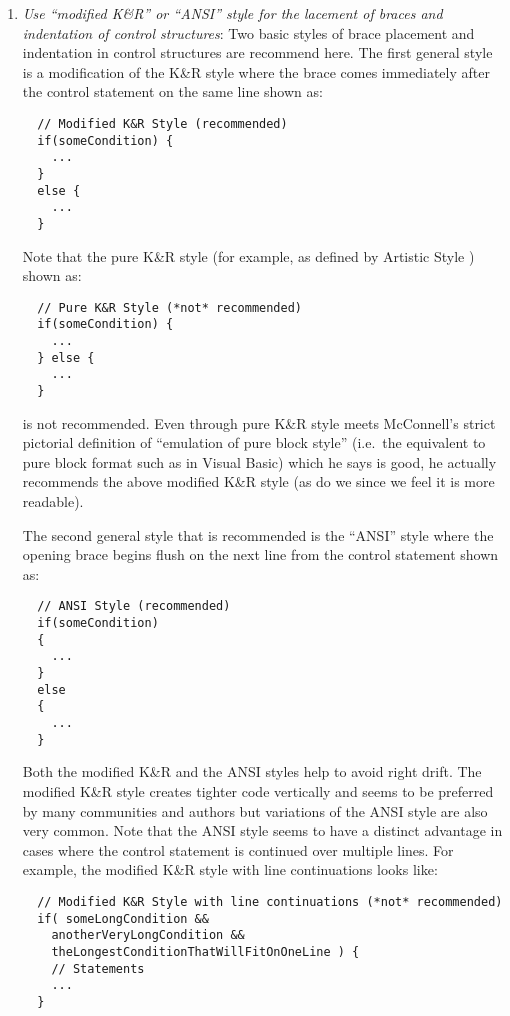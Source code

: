 \begin{enumerate}
{}\item\textit{Use ``modified K\&R'' or ``ANSI'' style for the lacement of
braces and indentation of control structures}: Two basic styles of brace
placement and indentation in control structures are recommend here.  The first
general style is a modification of the K\&R style{}\cite{ArtisticStyle} where
the brace comes immediately after the control statement on the same line shown
as:

{\small\begin{verbatim}
  // Modified K&R Style (recommended)
  if(someCondition) {
    ...
  }
  else {
    ...
  }
\end{verbatim}}

Note that the pure K\&R style (for example, as defined by Artistic Style
{}\cite{ArtisticStyle}) shown as:

{\small\begin{verbatim}
  // Pure K&R Style (*not* recommended)
  if(someCondition) {
    ...
  } else {
    ...
  }
\end{verbatim}}

is not recommended.  Even through pure K\&R style meets McConnell's strict
pictorial definition of ``emulation of pure block style'' (i.e.\ the
equivalent to pure block format such as in Visual Basic) which he says is
good, he actually recommends the above modified K\&R style (as do we since we
feel it is more readable).

The second general style that is recommended is the ``ANSI''
style{}\cite{ArtisticStyle} where the opening brace begins flush on the next
line from the control statement shown as:

{\small\begin{verbatim}
  // ANSI Style (recommended)
  if(someCondition)
  {
    ...
  }
  else
  {
    ...
  }
\end{verbatim}}

Both the modified K\&R and the ANSI styles help to avoid right drift.  The
modified K\&R style creates tighter code vertically and seems to be preferred
by many communities and authors but variations of the ANSI style are also very
common.  Note that the ANSI style seems to have a distinct advantage in cases
where the control statement is continued over multiple lines.  For example,
the modified K\&R style with line continuations looks like:

{\small\begin{verbatim}
  // Modified K&R Style with line continuations (*not* recommended)
  if( someLongCondition &&
    anotherVeryLongCondition &&
    theLongestConditionThatWillFitOnOneLine ) {
    // Statements
    ...
  }
\end{verbatim}}


\end{enumerate}
